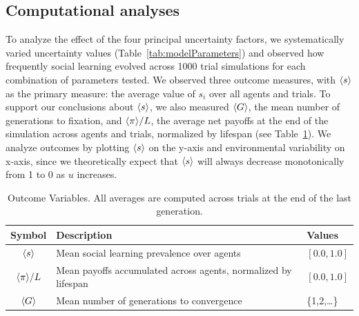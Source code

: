 \documentclass[letterpaper,11.5pt]{scrartcl}
\begin{document}
\subsection{Computational analyses}
\label{ssec:computationalAnalyses}


To analyze the effect of the four principal uncertainty factors, we systematically
varied uncertainty values (Table~\ref{tab:modelParameters}) and observed how frequently social learning evolved across
1000 trial simulations for each combination of parameters tested. %
We observed three outcome measures, with $\langle s \rangle$ as the primary measure: the average value of $s_i$ over all agents and trials. To support our conclusions
about $\langle s \rangle$, we also measured $\langle G \rangle$, the mean
number of generations to fixation, and $\langle \pi \rangle / L$, the average net  payoffs at the end of the simulation across agents and trials, normalized by lifespan (see Table~\ref{tab:outcomeVariables}). 
We analyze
outcomes by plotting $\langle s \rangle$ on the y-axis and environmental variability on
x-axis, since we
theoretically expect that $\langle s \rangle$ will always decrease monotonically from 1 to 0 as $u$
increases. %

\begin{table}[h]
    \caption{Outcome Variables. All averages are computed across trials at the end of the last generation.}
    \label{tab:outcomeVariables}
    \centering %
    \begin{tabular}{cp{4.25in}p{0.85in}} \toprule

        Symbol & Description & Values \\ 

        \midrule  

        $\langle s \rangle$ & Mean social learning prevalence over agents
                  & $ [0.0, 1.0]$ \\

        $\langle \pi \rangle / L$ & Mean payoffs accumulated across agents, normalized by
        lifespan & $ [0.0, 1.0]$ \\

        $\langle G \rangle$ & Mean number of generations to convergence & \{1,2,\ldots\} \\
        \bottomrule
    \end{tabular}
\end{table}
\end{document}
